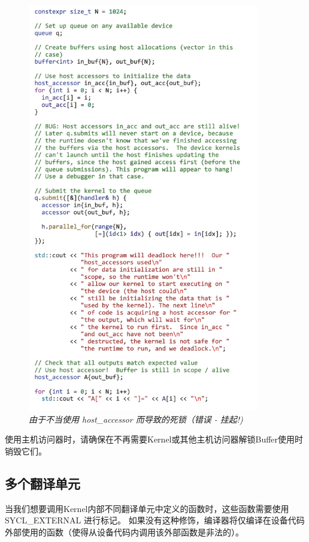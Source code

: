 \begin{figure}[H]
	\centering
	\includegraphics[width=0.9\textwidth]{figs/F13.13.png}
	\caption{\textit{由于不当使用 host\_accessor 而导致的死锁（错误 - 挂起!) }}
\end{figure}

\begin{remark}
	使用主机访问器时，请确保在不再需要Kernel或其他主机访问器解锁Buffer使用时销毁它们。
\end{remark}

\subsection{多个翻译单元}
当我们想要调用Kernel内部不同翻译单元中定义的函数时，这些函数需要使用 SYCL\_EXTERNAL 进行标记。 
如果没有这种修饰，编译器将仅编译在设备代码外部使用的函数（使得从设备代码内调用该外部函数是非法的）。

